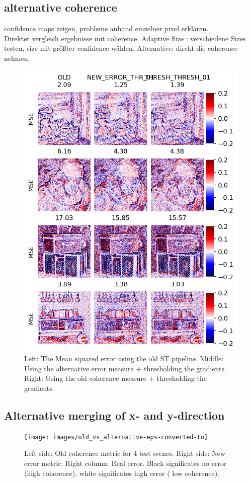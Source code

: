 \documentclass  [
  paper    = a4,
  BCOR     = 10mm,
  twoside,
  fontsize = 12pt,
  fleqn,
  toc      = bibnumbered,
  toc      = listofnumbered,
  numbers  = noendperiod,
  headings = normal,
  listof   = leveldown,
  version  = 3.03
]                                       {scrreprt}
\begin{document}
\subsection{alternative coherence}
confidence maps zeigen, probleme anhand einzelner pixel erklären.\\
Direkter vergleich ergebnisse mit coherence.
Adaptive Size : verschiedene Sizes testen, size mit größter confidence wählen. Alternative: direkt die coherence nehmen. 

\begin{figure}
	\centering
	\includegraphics[width=0.7\linewidth]{images/thresh_vs_old_vs_newerror}
	\caption[Comparing alternative coherence to new coherence]{Left: The Mean squared error using the old ST pipeline. Middle: Using the alternative error measure + thresholding the gradients. Right: Using the old coherence measure + thresholding the gradients.}
	\label{fig:threshvsoldvsnewerror}
\end{figure}

\subsection{Alternative merging of x- and y-direction}

\begin{figure}
	\centering
	\texttt{[image: images/old\_vs\_alternative-eps-converted-to]}
	\caption[Old coherence metric vs new error metric]{Left side: Old coherence metric for 4 test scenes. Right side: New error metric. Right column: Real error. Black significates no error (high coherence), white significates high error ( low coherence).}
	\label{fig:oldvsalternative}
\end{figure}
\end{document}
